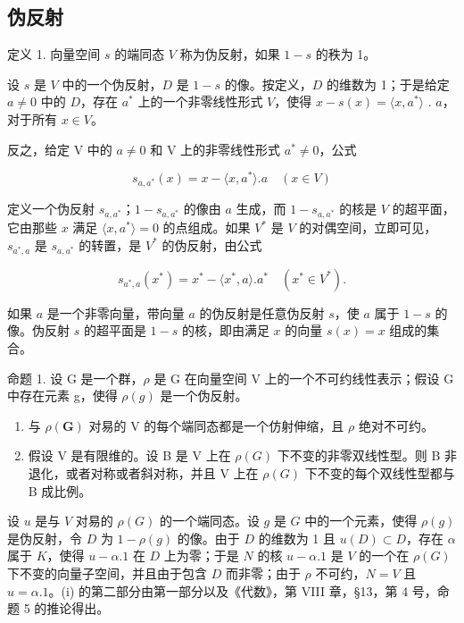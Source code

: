\subsection{伪反射}

定义 1. 向量空间 \(s\) 的端同态 \(V\) 称为伪反射，如果 \(1 - s\) 的秩为 1。

设 \(s\) 是 \(V\) 中的一个伪反射，\(D\) 是 \(1 - s\) 的像。按定义，\(D\) 的维数为 1；于是给定 \(a \neq 0\) 中的 \(D\)，存在 \(a^*\) 上的一个非零线性形式 \(V\)，使得 \(x - s(x) = \langle x, a^* \rangle\) . \(a\)，对于所有 \(x \in V\)。

反之，给定 V 中的 \(a \neq 0\) 和 V 上的非零线性形式 \(a^{*} \neq 0\)，公式

\[
s _ {a, a ^ {*}} (x) = x - \langle x, a ^ {*} \rangle . a \quad (x \in V)\tag{1}
\]

定义一个伪反射 \(s_{a,a^*}\)；\(1 - s_{a,a^*}\) 的像由 \(a\) 生成，而 \(1 - s_{a,a^*}\) 的核是 \(V\) 的超平面，它由那些 \(x\) 满足 \(\langle x, a^* \rangle = 0\) 的点组成。如果 \(V^*\) 是 \(V\) 的对偶空间，立即可见，\(s_{a^*,a}\) 是 \(s_{a,a^*}\) 的转置，是 \(V^*\) 的伪反射，由公式

\[
s _ {a ^ {*}, a} (x ^ {*}) = x ^ {*} - \langle x ^ {*}, a \rangle . a ^ {*} \quad (x ^ {*} \in V ^ {*}).\tag{2}
\]

如果 \(a\) 是一个非零向量，带向量 \(a\) 的伪反射是任意伪反射 \(s\)，使 \(a\) 属于 \(1 - s\) 的像。伪反射 \(s\) 的超平面是 \(1 - s\) 的核，即由满足 \(x\) 的向量 \(s(x) = x\) 组成的集合。

命题 1. 设 G 是一个群，\(\rho\) 是 G 在向量空间 V 上的一个不可约线性表示；假设 G 中存在元素 g，使得 \(\rho(g)\) 是一个伪反射。

\begin{enumerate}
\def\labelenumi{(\roman{enumi})}
\item
与 \(\rho(\mathbf{G})\) 对易的 V 的每个端同态都是一个仿射伸缩，且 \(\rho\) 绝对不可约。
\item
  假设 V 是有限维的。设 B 是 V 上在 \(\rho(G)\) 下不变的非零双线性型。则 B 非退化，或者对称或者斜对称，并且 V 上在 \(\rho(G)\) 下不变的每个双线性型都与 B 成比例。
\end{enumerate}

设 \(u\) 是与 \(V\) 对易的 \(\rho(G)\) 的一个端同态。设 \(g\) 是 \(G\) 中的一个元素，使得 \(\rho(g)\) 是伪反射，令 \(D\) 为 \(1 - \rho(g)\) 的像。由于 \(D\) 的维数为 1 且 \(u(D) \subset D\)，存在 \(\alpha\) 属于 \(K\)，使得 \(u - \alpha.1\) 在 \(D\) 上为零；于是 \(N\) 的核 \(u - \alpha.1\) 是 \(V\) 的一个在 \(\rho(G)\) 下不变的向量子空间，并且由于包含 \(D\) 而非零；由于 \(\rho\) 不可约，\(N = V\) 且 \(u = \alpha.1\)。(i) 的第二部分由第一部分以及《代数》，第 VIII 章，§13，第 4 号，命题 5 的推论得出。

